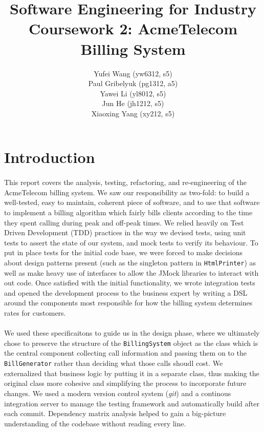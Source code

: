 \documentclass[a4paper,12pt,oneside,final]{article}
\author{
    Yufei Wang (yw6312, s5) \\ 
    Paul Gribelyuk (pg1312, a5) \\
    Yawei Li (yl8012, s5) \\ 
    Jun He (jh1212, s5) \\
    Xiaoxing Yang (xy212, s5)
}
\title{\Huge Software Engineering for Industry \\ Coursework 2: AcmeTelecom Billing System}
\begin{document}
\maketitle

\newpage

\section{Introduction} %
\paragraph{}
This report covers the analysis, testing, refactoring, and re-engineering of the AcmeTelecom billing system.  We saw our responsibility as two-fold: to build a well-tested, easy to maintain, coherent piece of software, and to use that software to implement a billing algorithm which fairly bills clients according to the time they spent calling during peak and off-peak times.  We relied heavily on Test Driven Development (TDD) practices in the way we devised tests, using unit tests to assert the state of our system, and mock tests to verify its behaviour.  To put in place tests for the initial code base, we were forced to make decisions about design patterns present (such as the singleton pattern in \verb+HtmlPrinter+) as well as make heavy use of interfaces to allow the JMock libraries to interact with out code.  Once satisfied with the initial functionality, we wrote integration tests and opened the development process to the business expert by writing a DSL around the components most responsible for how the billing system determines rates for customers.

\paragraph{}
We used these specificaitons to guide us in the design phase, where we ultimately chose to preserve the structure of the \verb+BillingSystem+ object as the class which is the central component collecting call information and passing them on to the \verb+BillGenerator+ rather than deciding what those calls shoudl cost.  We externalized that business logic by putting it in a separate class, thus making the original class more cohesive and simplifying the process to incorporate future changes.  We used a modern version control system (\emph{git}) and a continous integration server to manage the testing framework and automatically build after each commit.  Dependency matrix analysis helped to gain a big-picture understanding of the codebase without reading every line.
\end{document}
